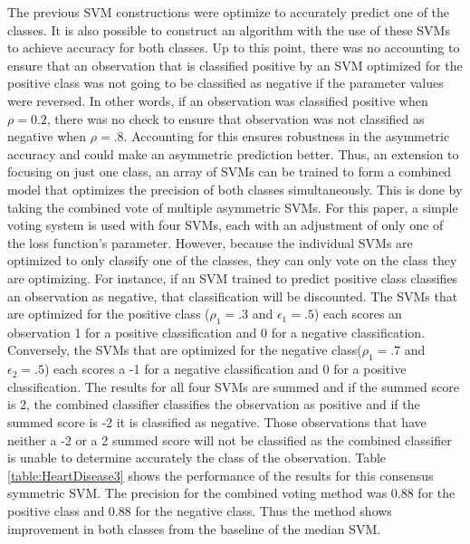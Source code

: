 \documentclass[twoside,11pt]{article}
\begin{document}
The previous SVM constructions were optimize to accurately predict one of the classes. It is also possible to construct an algorithm with the use of these SVMs to achieve accuracy for both classes. Up to this point, there was no accounting to ensure that an observation that is classified positive by an SVM optimized for the positive class was not going to be classified as negative if the parameter values were reversed. In other words, if an observation was classified positive when $\rho=0.2$, there was no check to ensure that observation was not classified as negative when $\rho=.8$. Accounting for this ensures robustness in the asymmetric accuracy and could make an asymmetric prediction better. Thus, an extension to focusing on just one class, an array of SVMs can be trained to form a combined model that optimizes the precision of both classes simultaneously. This is done by taking the combined vote of multiple asymmetric SVMs. For this paper, a simple voting system is used with four SVMs, each with an adjustment of only one of the loss function's parameter. However, because the individual SVMs are optimized to only classify one of the classes, they can only vote on the class they are optimizing. For instance, if an SVM trained to predict positive class classifies an observation as negative, that classification will be discounted. The SVMs that are optimized for the positive class ($\rho_1=.3$ and $\epsilon_1=.5$) each scores an observation 1 for a positive classification and 0 for a negative classification. Conversely, the SVMs that are optimized for the negative class($\rho_1=.7$ and $\epsilon_2=.5$) each scores a -1 for a negative classification and 0 for a positive classification. The results for all four SVMs are summed and if the summed score is 2, the combined classifier classifies the observation as positive and if the summed score is -2 it is classified as negative. Those observations that have neither a -2 or a 2 summed score will not be classified as the combined classifier is unable to determine accurately the class of the observation. Table \ref{table:HeartDisease3} shows the performance of the results for this consensus symmetric SVM. The precision for the combined voting method was 0.88 for the positive class and 0.88 for the negative class. Thus the method shows improvement in both classes from the baseline of the median SVM.
\end{document}
